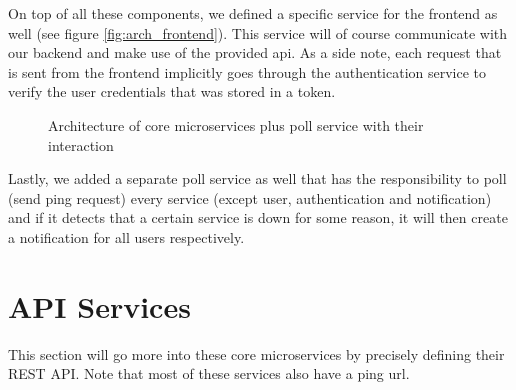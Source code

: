 \documentclass{article}
\begin{document}
On top of all these components, we defined a specific service for the frontend as well (see figure \ref{fig:arch_frontend}). This service will of course communicate with our backend and make use of the provided api. As a side note, each request that is sent from the frontend implicitly goes through the authentication service to verify the user credentials that was stored in a token.

\begin{figure}[H]
    \begin{center}
    \end{center}
    \caption{Architecture of core microservices plus poll service with their interaction}
    \label{fig:arch_poll}
\end{figure}

Lastly, we added a separate poll service as well that has the responsibility to poll (send ping request) every service (except user, authentication and notification) and if it detects that a certain service is down for some reason, it will then create a notification for all users respectively.

\section{API Services}
\label{api}

This section will go more into these core microservices by precisely defining their REST API. Note that most of these services also have a ping url.
\end{document}
